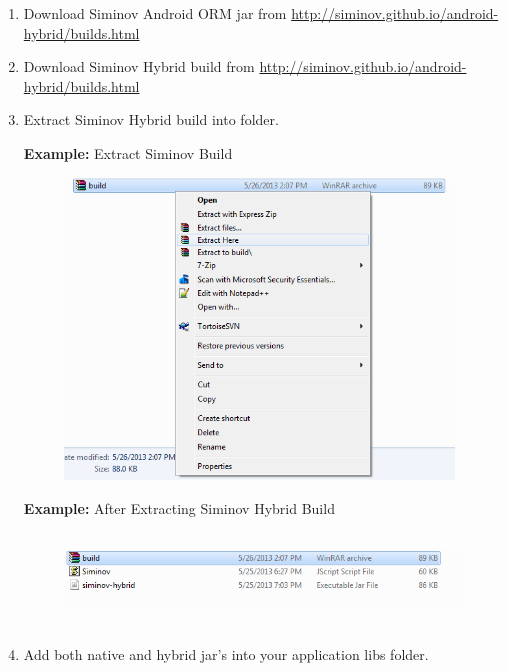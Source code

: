 \begin{enumerate}

	\item \small Download Siminov Android ORM jar from \url{http://siminov.github.io/android-hybrid/builds.html}

	\item \small Download Siminov Hybrid build from \url{http://siminov.github.io/android-hybrid/builds.html}

	\item \small Extract Siminov Hybrid build into folder. 

		\par
		\textbf{Example:} Extract Siminov Build
		\begin{figure}[htbp]
			\centering
				\includegraphics[height=8cm]{Resources/siminov_hybrid_build_extract.png}
		\end{figure}	

		\par
		\textbf{Example:} After Extracting Siminov Hybrid Build
		\begin{figure}[htbp]
			\centering
				\includegraphics[height=2.5cm]{Resources/siminov_hybrid_build_extracted.png}
		\end{figure}	


	\newpage
	\item \small Add both native and hybrid jar's into your application libs folder.


\end{enumerate}
